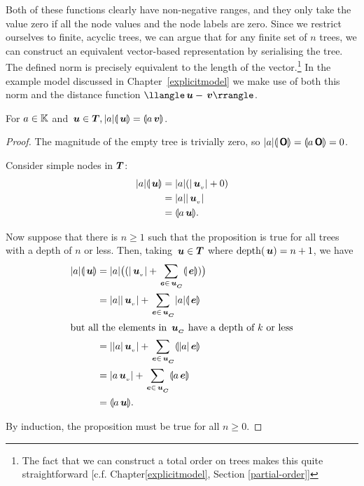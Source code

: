 Both of these functions clearly have non-negative ranges, and they
only take the value zero if all the node values and the node labels
are zero.  Since we restrict ourselves to finite, acyclic trees, we
can argue that for any finite set of $n$ trees, we can construct an
equivalent vector-based representation by serialising the tree.
The defined norm is precisely equivalent to the length
of the vector.\footnote{The fact that we can construct a total order
  on trees makes this quite straightforward
  [c.f. Chapter\ref{explicitmodel}, Section \ref{partial-order}]}
In the example model discussed in Chapter~\ref{explicitmodel} we 
make use of both this norm and the distance function
$\nnorm{\node{u}-\node{v}}$.

\begin{proposition}\label{absolutehomogeneity}
  For \(a \in \mathbb{K}\) and \(\,\boldsymbol{u} \in \boldsymbol{T}, \lvert{a}\rvert\llparenthesis{\,\boldsymbol{u}}\rrparenthesis =
  \llparenthesis{a \,\boldsymbol{v}}\rrparenthesis\).
\begin{proof}
  The magnitude of the empty tree is trivially zero, so \(\lvert{a}\rvert\llparenthesis{\,\boldsymbol{\mathsf{O}}}\rrparenthesis =
  \llparenthesis{a\,\boldsymbol{\mathsf{O}}}\rrparenthesis = 0\).

  Consider simple nodes in $\boldsymbol{T}$:
  \begin{align*}
      \lvert{a}\rvert\llparenthesis{\,\boldsymbol{u}}\rrparenthesis &= \lvert{a}\rvert(\lvert{{\,\boldsymbol{u}}_{{}_{v}}}\rvert + 0) \\
      &= \lvert{a}\rvert\lvert{{\,\boldsymbol{u}}_{{}_{v}}}\rvert \\
      &= \llparenthesis{a \,\boldsymbol{u}}\rrparenthesis.
  \end{align*}

  Now suppose that there is \(n \ge 1\) such that the proposition is true for
  all trees with a depth of \(n\) or less. Then, taking \(\,\boldsymbol{u} \in
  \boldsymbol{T}\) where \(\operatorname{depth}(\,\boldsymbol{u}) = n+1\), we have
  \begin{align*}
      \lvert{a}\rvert\llparenthesis{\,\boldsymbol{u}}\rrparenthesis &= \lvert{a}\rvert\bigl((\lvert{{\,\boldsymbol{u}}_{{}_{v}}}\rvert + \sum_{\,\boldsymbol{e}\in{\,\boldsymbol{u}}_{{}_{\boldsymbol{C}}}}\llparenthesis{\,\boldsymbol{e}}\rrparenthesis)\bigr) \\
      &= \lvert{a}\rvert\lvert{{\,\boldsymbol{u}}_{{}_{v}}}\rvert + \sum_{\,\boldsymbol{e}\in{\,\boldsymbol{u}}_{{}_{\boldsymbol{C}}}}\lvert{a}\rvert\llparenthesis{\,\boldsymbol{e}}\rrparenthesis\\
      \intertext{but all the elements in \({\,\boldsymbol{u}}_{{}_{\boldsymbol{C}}}\) have a depth of \(k\) or less}
      &= \lvert{\lvert{a}\rvert{\,\boldsymbol{u}}_{{}_{v}}}\rvert + \sum_{\,\boldsymbol{e}\in{\,\boldsymbol{u}}_{{}_{\boldsymbol{C}}}}\llparenthesis{\lvert{a}\rvert\,\boldsymbol{e}}\rrparenthesis \\
      &= \lvert{a{\,\boldsymbol{u}}_{{}_{v}}}\rvert + \sum_{\,\boldsymbol{e}\in{\,\boldsymbol{u}}_{{}_{\boldsymbol{C}}}}\llparenthesis{a \,\boldsymbol{e}}\rrparenthesis \\
      &= \llparenthesis{a \,\boldsymbol{u}}\rrparenthesis.
  \end{align*}

  By induction, the proposition must be true for all \(n \geq 0\).
\end{proof}
\end{proposition}


